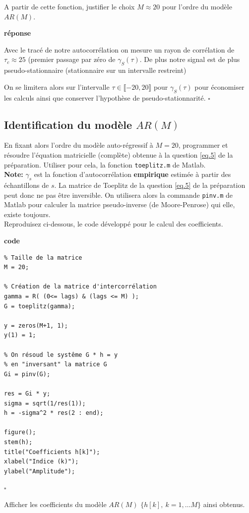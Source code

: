 \documentclass{article}
\newcommand{\debutrep}[1]{\color{blue}\begin{center} \hrulefill \textbf{ #1 } \hrulefill \end{center} }
\newcommand{\finrep}{\vspace*{5mm}\hfill $\square$\color{black}\vspace*{5mm}}
\begin{document}
A partir de cette fonction, justifier le choix $M \approx 20$ pour l'ordre du modèle $AR(M)$.

\debutrep{réponse}
Avec le tracé de notre autocorrélation on mesure un rayon de corrélation de $\tau_c \approx 25$ (premier passage par zéro de $\gamma_S(\tau)$. De plus notre signal est de plus pseudo-stationnaire (stationnaire sur un intervalle restreint)

On se limitera alors sur l'intervalle $\tau \in \llbracket -20,20 \rrbracket$ pour $\gamma_S(\tau)$ pour économiser les calculs ainsi que conserver l'hypothèse de pseudo-stationnarité.
\finrep

\subsection{Identification du modèle $AR(M)$}

En fixant alors l'ordre du modèle auto-régressif à $M=20$, programmer et résoudre l'équation matricielle (complète) obtenue à la question  \ref{eq.5} de la préparation. Utiliser pour cela, la fonction {\tt toeplitz.m} de Matlab. \\[1mm]
\textbf{Note:} $\gamma_s$ est la fonction d'autocorrélation  \textbf{empirique} estimée à partir des échantillons de $s$. La matrice de Toeplitz de la question \ref{eq.5} de la préparation peut donc ne pas être inversible. On utilisera alors la commande {\tt pinv.m} de Matlab pour calculer la matrice pseudo-inverse (de Moore-Penrose) qui elle, existe toujours.\\[1mm]
Reproduisez ci-dessous, le code développé pour le calcul des coefficients.

\debutrep{code}
\begin{verbatim}
% Taille de la matrice
M = 20;

% Création de la matrice d'intercorrélation
gamma = R( (0<= lags) & (lags <= M) );
G = toeplitz(gamma);

y = zeros(M+1, 1);
y(1) = 1;

% On résoud le systême G * h = y
% en "inversant" la matrice G
Gi = pinv(G);

res = Gi * y;
sigma = sqrt(1/res(1));
h = -sigma^2 * res(2 : end);

figure();
stem(h);
title("Coefficients h[k]");
xlabel("Indice (k)");
ylabel("Amplitude");
\end{verbatim}
\finrep

Afficher les coefficients  du modèle $AR(M)$ $\{h[k],~k=1,\ldots M\}$ ainsi obtenus.
\end{document}
